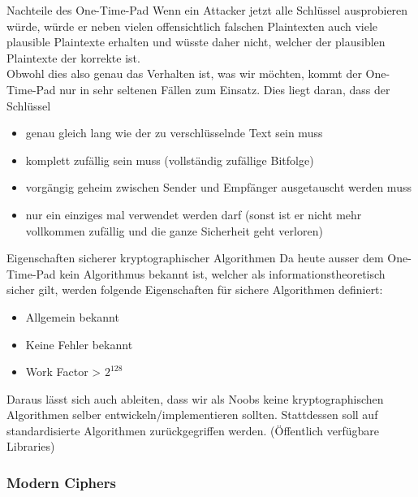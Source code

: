 \begin{corollary}{Nachteile des One-Time-Pad}
    Wenn ein Attacker jetzt alle Schlüssel ausprobieren würde, würde er neben vielen offensichtlich falschen Plaintexten auch viele plausible Plaintexte erhalten und wüsste daher nicht, welcher der plausiblen Plaintexte der korrekte ist.
    \vspace{2mm}\\
    Obwohl dies also genau das Verhalten ist, was wir möchten, kommt der One-Time-Pad nur in sehr seltenen Fällen zum Einsatz. Dies liegt daran, dass der Schlüssel
    \begin{itemize}
        \item genau gleich lang wie der zu verschlüsselnde Text sein muss
        \item komplett zufällig sein muss (vollständig zufällige Bitfolge)
        \item vorgängig geheim zwischen Sender und Empfänger ausgetauscht werden muss
        \item nur ein einziges mal verwendet werden darf (sonst ist er nicht mehr vollkommen zufällig und die ganze Sicherheit geht verloren)
    \end{itemize}
\end{corollary}

\begin{concept}{Eigenschaften sicherer kryptographischer Algorithmen}
    Da heute ausser dem One-Time-Pad kein Algorithmus bekannt ist, welcher als informationstheoretisch sicher gilt, werden folgende Eigenschaften für sichere Algorithmen definiert:
    \begin{itemize}
        \item Allgemein bekannt
        \item Keine Fehler bekannt
        \item Work Factor > $2^{128}$
    \end{itemize}
    Daraus lässt sich auch ableiten, dass wir als Noobs keine kryptographischen Algorithmen selber entwickeln/implementieren sollten. Stattdessen soll auf standardisierte Algorithmen zurückgegriffen werden. (Öffentlich verfügbare Libraries)
\end{concept}



\raggedcolumns
\columnbreak


\subsubsection{Modern Ciphers}

